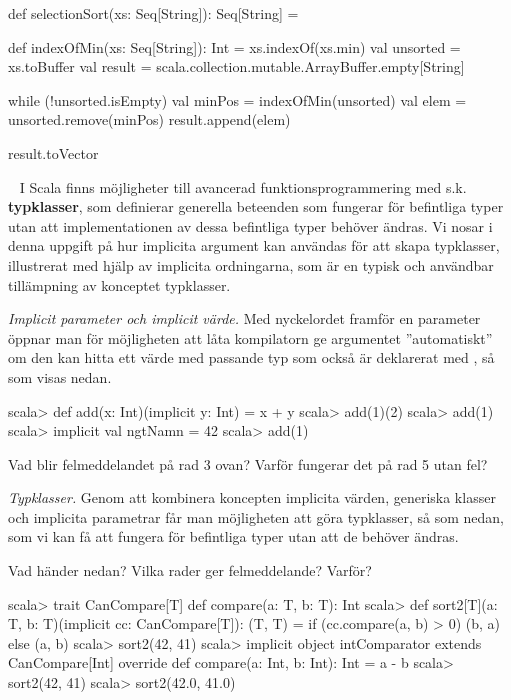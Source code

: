 \begin{Code}
def selectionSort(xs: Seq[String]): Seq[String] = {
  def indexOfMin(xs: Seq[String]): Int = xs.indexOf(xs.min)
  val unsorted = xs.toBuffer
  val result = scala.collection.mutable.ArrayBuffer.empty[String]

  while (!unsorted.isEmpty) {
    val minPos = indexOfMin(unsorted)
    val elem = unsorted.remove(minPos)
    result.append(elem)
  }

  result.toVector
}
\end{Code}


\QUESTEND







\QUESTBEGIN

\Task  \what~  I Scala finns möjligheter till avancerad funktionsprogrammering med s.k. \textbf{typklasser}, som definierar generella beteenden som fungerar för befintliga typer utan att implementationen av dessa befintliga typer behöver ändras. Vi nosar i denna uppgift på hur implicita argument kan användas för att skapa typklasser, illustrerat med hjälp av implicita ordningarna, som är en typisk och användbar tillämpning av konceptet typklasser.

\Subtask \emph{Implicit parameter och implicit värde.} Med nyckelordet  framför en parameter öppnar man för möjligheten att låta kompilatorn ge argumentet ''automatiskt'' om den kan hitta ett värde med passande typ som också är deklarerat med , så som visas nedan.
\begin{REPL}
scala> def add(x: Int)(implicit y: Int) = x + y
scala> add(1)(2)
scala> add(1)
scala> implicit val ngtNamn = 42
scala> add(1)
\end{REPL}
Vad blir felmeddelandet på rad 3 ovan? Varför fungerar det på rad 5 utan fel?

\Subtask \emph{Typklasser.} Genom att kombinera koncepten implicita värden, generiska klasser och implicita parametrar får man möjligheten att göra typklasser, så som  nedan, som vi kan få att fungera för befintliga typer utan att de behöver ändras.

Vad händer nedan? Vilka rader ger felmeddelande? Varför?

\begin{REPL}
scala> trait CanCompare[T] { def compare(a: T, b: T): Int }
scala> def sort2[T](a: T, b: T)(implicit cc: CanCompare[T]): (T, T) =
         if (cc.compare(a, b) > 0) (b, a) else (a, b)
scala> sort2(42, 41)
scala> implicit object intComparator extends CanCompare[Int]{
         override def compare(a: Int, b: Int): Int = a - b
       }
scala> sort2(42, 41)
scala> sort2(42.0, 41.0)
\end{REPL}

